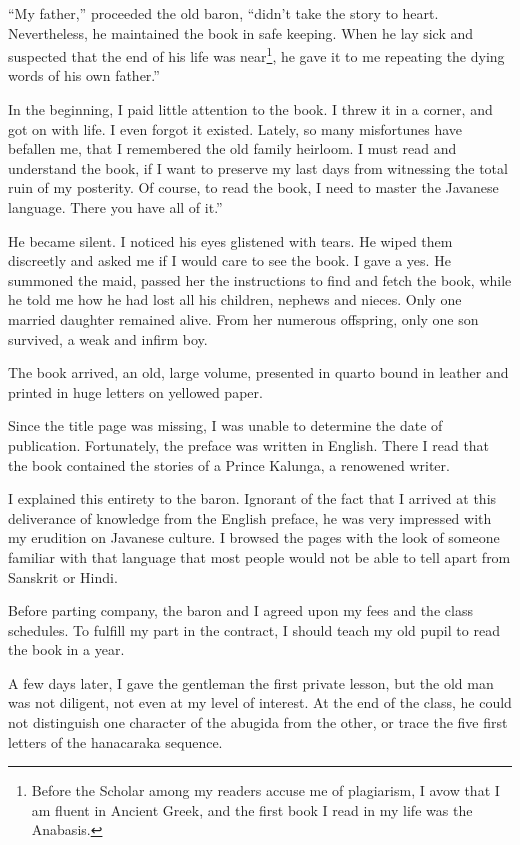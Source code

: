 \documentclass[a4paper,12pt]{book}
\begin{document}
``My father,'' proceeded the old baron, ``didn't take
the story to heart. Nevertheless, he maintained
the book in safe keeping.
When he lay sick and suspected that the end of his
life was near\footnote{Before the Scholar among
my readers accuse me of plagiarism,
I avow that I am fluent in Ancient Greek,
and the first book I read in my life
was the Anabasis.},
he gave it to me repeating the
dying words of his own father.''

In the beginning, I 
paid little attention to the book. I threw it 
in a corner, and got on with life.
I even forgot it existed. Lately,
so many misfortunes have befallen me,
that I remembered the old family heirloom.
I must read and understand the book, if I want to
preserve my last days from witnessing the total
ruin of my posterity. Of course, to read the book,
I need to master the Javanese language.
There you have all of it.''

He became silent. I noticed his eyes glistened
with tears.
He wiped them discreetly and asked me if I
would care to see the book. I gave a yes.
He summoned the maid, passed her the instructions
to find and fetch the book,
while he told me how he had lost all his children,
nephews and nieces. Only one married daughter
remained alive. From her numerous offspring,
only one son survived, a  weak and infirm boy.

The book arrived, an old,
large volume, presented in
quarto bound in leather and printed in huge
letters on yellowed paper.

Since the title page
was missing, I was unable to determine
the date of publication. Fortunately,
the preface was written
in English. There I read that the book
contained the stories of a Prince Kalunga,
a renowened writer.

I explained this entirety to the baron.
Ignorant of the fact that I arrived at 
this deliverance of knowledge
from the English preface, he was
very impressed with my erudition on
Javanese culture. I browsed the pages
with the look of someone familiar
with that language that most people
would not be able to tell apart from
Sanskrit or Hindi.

Before parting company, the baron and I
agreed upon my fees
and the class schedules.
To fulfill my part in the contract,
I should teach my old pupil to read
the book in a year.

A few days later, I gave the gentleman
the first private lesson, but the old man
was not diligent, not even at my level
of interest. At the
end of the class, he could not distinguish
one character of the abugida from the other,
or trace the five first letters of the
hanacaraka sequence.
\end{document}
